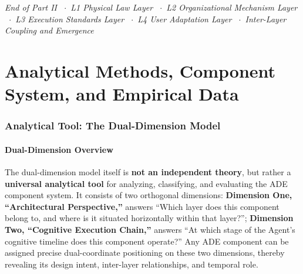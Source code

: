 \documentclass[11pt,a4paper]{article}
\begin{document}
\vspace{1cm}
\begin{center}
\emph{End of Part II \ $\cdot$\  L1 Physical Law Layer \ $\cdot$\  L2 Organizational Mechanism Layer \ $\cdot$\  L3 Execution Standards Layer \ $\cdot$\  L4 User Adaptation Layer \ $\cdot$\  Inter-Layer Coupling and Emergence}
\end{center}



\part{Analytical Methods, Component System, and Empirical Data}
\label{part:III}

\section{Analytical Tool: The Dual-Dimension Model}
\label{sec:9}

\subsection{Dual-Dimension Overview}
\label{sec:9.1}

The dual-dimension model itself is \textbf{not an independent theory}, but rather a \textbf{universal analytical tool} for analyzing, classifying, and evaluating the ADE component system. It consists of two orthogonal dimensions: \textbf{Dimension One, ``Architectural Perspective,''} answers ``Which layer does this component belong to, and where is it situated horizontally within that layer?''; \textbf{Dimension Two, ``Cognitive Execution Chain,''} answers ``At which stage of the Agent's cognitive timeline does this component operate?'' Any ADE component can be assigned precise dual-coordinate positioning on these two dimensions, thereby revealing its design intent, inter-layer relationships, and temporal role.
\end{document}
